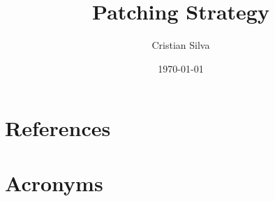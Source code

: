 \documentclass[PMO,authoryear,toc]{lsstdoc}
\title{Patching Strategy}
\author{%
Cristian Silva
}
\date{\today}
\begin{document}
\maketitle




\appendix
\section{References} \label{sec:bib}
\renewcommand{\refname}{} %


\section{Acronyms} \label{sec:acronyms}

\end{document}

